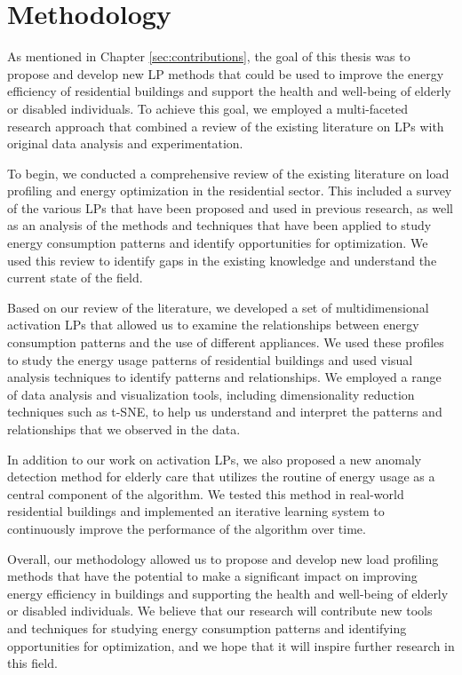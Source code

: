 
\chapter{Methodology} %
\label{chapter3} 

As mentioned in Chapter \ref{sec:contributions}, the goal of this thesis was to propose and develop new LP methods that could be used to improve the energy efficiency of residential buildings and support the health and well-being of elderly or disabled individuals. 
To achieve this goal, we employed a multi-faceted research approach that combined a review of the existing literature on LPs with original data analysis and experimentation.

To begin, we conducted a comprehensive review of the existing literature on load profiling and energy optimization in the residential sector.
This included a survey of the various LPs that have been proposed and used in previous research,
as well as an analysis of the methods and techniques that have been applied to study energy consumption patterns and identify opportunities for optimization.
We used this review to identify gaps in the existing knowledge and understand the current state of the field.

Based on our review of the literature, we developed a set of multidimensional activation LPs that allowed us to examine the relationships between energy consumption patterns and the use of different appliances.
We used these profiles to study the energy usage patterns of residential buildings and used visual analysis techniques to identify patterns and relationships.
We employed a range of data analysis and visualization tools, including dimensionality reduction techniques such as t-SNE, to help us understand and interpret the patterns and relationships that we observed in the data.

In addition to our work on activation LPs, we also proposed a new anomaly detection method for elderly care that utilizes the routine of energy usage as a central component of the algorithm. 
We tested this method in real-world residential buildings and implemented an iterative learning system to continuously improve the performance of the algorithm over time.

Overall, our methodology allowed us to propose and develop new load profiling methods that have the potential to make a significant impact on improving energy efficiency in buildings and supporting the health and well-being of elderly or disabled individuals.
We believe that our research will contribute new tools and techniques for studying energy consumption patterns and identifying opportunities for optimization, and we hope that it will inspire further research in this field.


